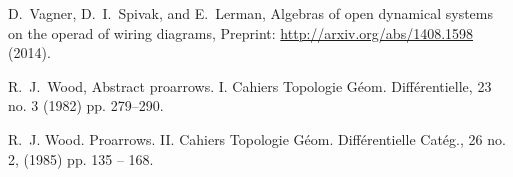 \documentclass[11pt,oneside,article]{memoir}
\begin{document}
\begin{thebibliography}{XXX}
 D.~Vagner, D.~I.~Spivak, and E.~Lerman, Algebras of open dynamical systems on the operad of wiring diagrams, Preprint: \url{http://arxiv.org/abs/1408.1598} (2014).

 R.~J.~Wood, Abstract proarrows. I. Cahiers Topologie G\'{e}om. Diff\'{e}rentielle, 23 no. 3 (1982) pp. 279--290.

 R.~J. Wood. Proarrows. II. Cahiers Topologie G\'{e}om. Diff\'{e}rentielle Cat\'{e}g., 26 no. 2, (1985) pp. 135 -- 168.

\end{thebibliography}
\end{document}
